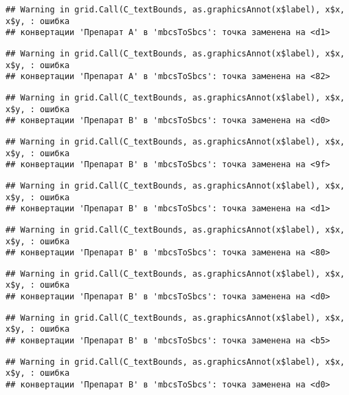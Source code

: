 \documentclass[
]{article}
\begin{document}
\begin{verbatim}
## Warning in grid.Call(C_textBounds, as.graphicsAnnot(x$label), x$x, x$y, : ошибка
## конвертации 'Препарат A' в 'mbcsToSbcs': точка заменена на <d1>
\end{verbatim}

\begin{verbatim}
## Warning in grid.Call(C_textBounds, as.graphicsAnnot(x$label), x$x, x$y, : ошибка
## конвертации 'Препарат A' в 'mbcsToSbcs': точка заменена на <82>
\end{verbatim}

\begin{verbatim}
## Warning in grid.Call(C_textBounds, as.graphicsAnnot(x$label), x$x, x$y, : ошибка
## конвертации 'Препарат B' в 'mbcsToSbcs': точка заменена на <d0>
\end{verbatim}

\begin{verbatim}
## Warning in grid.Call(C_textBounds, as.graphicsAnnot(x$label), x$x, x$y, : ошибка
## конвертации 'Препарат B' в 'mbcsToSbcs': точка заменена на <9f>
\end{verbatim}

\begin{verbatim}
## Warning in grid.Call(C_textBounds, as.graphicsAnnot(x$label), x$x, x$y, : ошибка
## конвертации 'Препарат B' в 'mbcsToSbcs': точка заменена на <d1>
\end{verbatim}

\begin{verbatim}
## Warning in grid.Call(C_textBounds, as.graphicsAnnot(x$label), x$x, x$y, : ошибка
## конвертации 'Препарат B' в 'mbcsToSbcs': точка заменена на <80>
\end{verbatim}

\begin{verbatim}
## Warning in grid.Call(C_textBounds, as.graphicsAnnot(x$label), x$x, x$y, : ошибка
## конвертации 'Препарат B' в 'mbcsToSbcs': точка заменена на <d0>
\end{verbatim}

\begin{verbatim}
## Warning in grid.Call(C_textBounds, as.graphicsAnnot(x$label), x$x, x$y, : ошибка
## конвертации 'Препарат B' в 'mbcsToSbcs': точка заменена на <b5>
\end{verbatim}

\begin{verbatim}
## Warning in grid.Call(C_textBounds, as.graphicsAnnot(x$label), x$x, x$y, : ошибка
## конвертации 'Препарат B' в 'mbcsToSbcs': точка заменена на <d0>
\end{verbatim}
\end{document}
